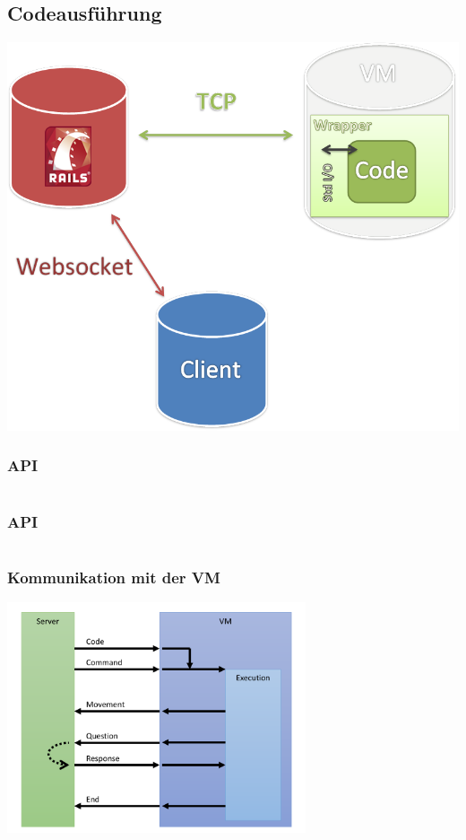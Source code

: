 \subsection{Codeausführung}

\begin{frame}
\begin{center}
	\includegraphics[scale=0.35]{overview}
\end{center}
\end{frame}

\begin{frame}
\frametitle{API}
\inputminted[linenos, numbersep=2pt, tabsize=4, frame=lines, label=move]{ruby}{vm/move.rb}
\end{frame}

\begin{frame}
\frametitle{API}
\inputminted[linenos, numbersep=2pt, tabsize=4, frame=lines, label=look]{ruby}{vm/look.rb}
\end{frame}

\begin{frame}
\frametitle{Kommunikation mit der VM}
\begin{center}
\includegraphics[width=250pt]{vm/vm.pdf}
\end{center}
\end{frame}